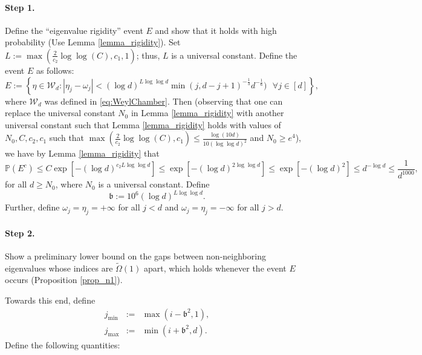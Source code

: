 \documentclass[11pt,letterpaper]{article}
\begin{document}
\paragraph{Step 1.}  Define the ``eigenvalue rigidity'' event $E$ and show that it holds with high probability (Use Lemma \ref{lemma_rigidity}).
%
Set $L:= \max( \frac{2}{c_2} \log \log(C), c_1, 1)$;  thus, $L$ is a universal constant.
%
Define the event $E$ as follows:
%
\begin{equation}\label{eq_n19}
E:= \left \{\eta \in \mathcal{W}_d : |\eta_j - \omega_j| < (\log d)^{ L\log \log d} \min(j, d-j+1)^{-\frac{1}{3}} d^{-\frac{1}{6}} )  \,\,\,\, \forall j \in [d] \right\},
\end{equation}
%
where $\mathcal{W}_d$ was defined in \eqref{eq:WeylChamber}.
%
Then (observing that one can replace the universal constant $N_0$ in Lemma \ref{lemma_rigidity} with another universal constant such that Lemma \ref{lemma_rigidity} holds with values of $N_0, C, c_2, c_1$ such that $\max( \frac{2}{c_2} \log \log(C), c_1) \leq \frac{\log(10 d)}{10 (\log\log d)^2}$ and $N_0 \geq e^{4}$), we have by Lemma \ref{lemma_rigidity} that
%
\begin{equation} \label{eq_rigidity_1}
    \mathbb{P}(E^c) \leq  C \exp[ -(\log d)^{c_2 L \log \log d}]\leq  \exp[ -(\log d)^{2 \log \log d}] \leq  \exp[ -(\log d)^{2}] \leq  d^{ -\log d} \leq \frac{1}{d^{1000}},
    \end{equation}
    for all $d \geq N_0$, where $N_0$ is a  universal constant.
%
Define 
%
\begin{equation}\label{eq_n37}
\mathfrak{b} := 10^6(\log d)^{ L\log \log d}.
\end{equation}
%
%
Further, define $\omega_j=\eta_{j} = + \infty$ for all $j < d$ and  $\omega_j=\eta_{j} = - \infty$ for all $j>d$. 

\paragraph{Step 2.} 
%
Show a preliminary lower bound on the gaps between non-neighboring eigenvalues whose indices are $\tilde{\Omega}(1)$ apart, which holds whenever the event $E$ occurs (Proposition \ref{prop_n1}).

%
%
Towards this end, define
%
 \begin{eqnarray}\label{eq_n28}
 j_{\mathrm{min}}&:=& \max(i-\mathfrak{b}^2, 1), \nonumber\\
 j_{\mathrm{max}}&:=& \min(i+\mathfrak{b}^2, d).
  \end{eqnarray}
%
%
Define the following quantities: 
\end{document}

